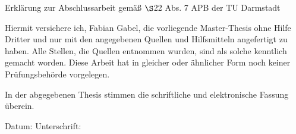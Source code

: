 \thispagestyle{empty}
\vspace*{9 cm}
\begin{center}
Erklärung zur Abschlussarbeit gemäß \(\S\)22 Abs. 7 APB der TU Darmstadt
\end{center}

Hiermit versichere ich, Fabian Gabel, die vorliegende Master-Thesis ohne Hilfe Dritter und nur mit den angegebenen Quellen und Hilfsmitteln angefertigt zu haben. Alle Stellen, die Quellen entnommen wurden, sind als solche kenntlich gemacht worden. Diese Arbeit hat in gleicher oder ähnlicher Form noch keiner Prüfungsbehörde vorgelegen. 

In der abgegebenen Thesis stimmen die schriftliche und elektronische Fassung überein.

\vspace{2 cm}

Datum: \hspace{5 cm} Unterschrift:
\clearpage
